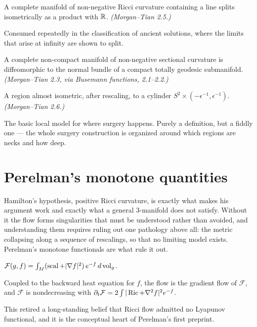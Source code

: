 \begin{theorem}
  \label{thm:splitting}
  A complete manifold of non-negative Ricci curvature containing a line splits
  isometrically as a product with $\mathbb{R}$. \emph{(Morgan--Tian 2.5.)}

  Consumed repeatedly in the classification of ancient solutions, where the
  limits that arise at infinity are shown to split.
\end{theorem}

\begin{theorem}
  \label{thm:soul}
  A complete non-compact manifold of non-negative sectional curvature is
  diffeomorphic to the normal bundle of a compact totally geodesic submanifold.
  \emph{(Morgan--Tian 2.3, via Busemann functions, 2.1--2.2.)}
\end{theorem}

\begin{definition}
  \label{def:neck}
  A region almost isometric, after rescaling, to a cylinder
  $S^2 \times (-\epsilon^{-1}, \epsilon^{-1})$. \emph{(Morgan--Tian 2.6.)}

  The basic local model for where surgery happens. Purely a definition, but a
  fiddly one --- the whole surgery construction is organized around which
  regions are necks and how deep.
\end{definition}

\chapter{Perelman's monotone quantities}
\label{chap:entropy}

Hamilton's hypothesis, positive Ricci curvature, is exactly what makes his
argument work and exactly what a general $3$-manifold does not satisfy. Without
it the flow forms singularities that must be understood rather than avoided,
and understanding them requires ruling out one pathology above all: the metric
collapsing along a sequence of rescalings, so that no limiting model exists.
Perelman's monotone functionals are what rule it out.

\begin{definition}
  \label{def:f-functional}
  $\mathcal{F}(g,f) = \int_M (\operatorname{scal} + |\nabla f|^2)\, e^{-f}\, d\operatorname{vol}_g$.
\end{definition}

\begin{theorem}
  \label{thm:f-monotone}
  Coupled to the backward heat equation for $f$, the flow is the gradient flow
  of $\mathcal{F}$, and $\mathcal{F}$ is nondecreasing with
  $\partial_t \mathcal{F} = 2\int |\operatorname{Ric} + \nabla^2 f|^2 e^{-f}$.

  This retired a long-standing belief that Ricci flow admitted no Lyapunov
  functional, and it is the conceptual heart of Perelman's first preprint.
\end{theorem}

